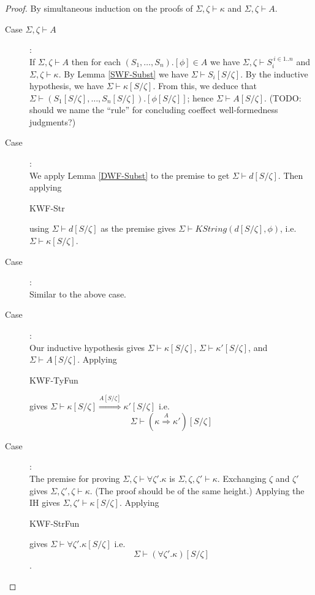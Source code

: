 \documentclass{article}
\begin{document}
\begin{proof}
By simultaneous induction on the proofs of $\Sigma,\zeta \vdash \kappa$ and $\Sigma,\zeta \vdash A$. 

\begin{description}
\item[Case $\Sigma,\zeta \vdash A$]:~\\
If $\Sigma,\zeta \vdash A$ then for each $(S_1,\ldots,S_n).[\phi] \in A$ we 
have $\Sigma,\zeta \vdash S_i^{~i \in 1..n}$ and $\Sigma,\zeta \vdash \kappa$. By Lemma \ref{SWF-Subst} we have
$\Sigma \vdash S_i[S/\zeta]$. By the inductive hypothesis, we have $\Sigma \vdash \kappa[S/\zeta]$. From this,
we deduce that $\Sigma \vdash (S_1[S/\zeta],\ldots,S_n[S/\zeta]).[\phi[S/\zeta]]$; hence $\Sigma \vdash A[S/\zeta]$. (TODO: should we name the ``rule'' for concluding coeffect well-formedness judgments?)
\item[Case ]:~\\
We apply Lemma \ref{DWF-Subst} to the premise to get $\Sigma \vdash d[S/\zeta]$. Then applying 
\begin{sc}KWF-Str\end{sc} using $\Sigma \vdash d[S/\zeta]$ as the premise gives 
$\Sigma \vdash \mathit{KString}(d[S/\zeta],\phi)$, i.e. $\Sigma \vdash \kappa[S/\zeta]$.

\item[Case ]:~\\
Similar to the above case.

\item[Case ]:~\\
Our inductive hypothesis gives $\Sigma \vdash \kappa[S/\zeta]$, $\Sigma \vdash \kappa'[S/\zeta]$, and
$\Sigma \vdash A[S/\zeta]$. Applying \begin{sc}KWF-TyFun\end{sc} gives $\Sigma \vdash \kappa[S/\zeta] \overset{A[S/\zeta]}{\Rightarrow} \kappa'[S/\zeta]$ i.e. $$\Sigma \vdash (\kappa \overset{A}{\Rightarrow} \kappa')[S/\zeta]$$

\item[Case ]:~\\
The premise for proving $\Sigma,\zeta \vdash \forall \zeta'.\kappa$ is $\Sigma,\zeta,\zeta' \vdash \kappa$. Exchanging $\zeta$ and $\zeta'$ gives $\Sigma,\zeta',\zeta \vdash \kappa$. (The proof should be of the same height.) Applying the IH gives $\Sigma,\zeta' \vdash \kappa[S/\zeta]$. Applying \begin{sc}KWF-StrFun\end{sc} gives $\Sigma \vdash \forall \zeta'. \kappa[S/\zeta]$ i.e.
$$\Sigma \vdash (\forall \zeta'. \kappa)[S/\zeta]$$.
\end{description}
\end{proof}
\end{document}
